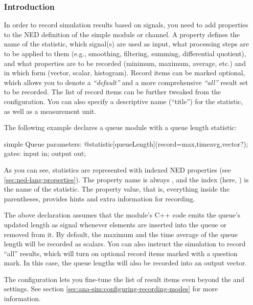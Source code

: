 \subsubsection{Introduction}
\label{sec:simple-modules:declared-statistics:introduction}

In order to record simulation results based on signals, you need to add
 properties to the NED definition of the simple module
or channel. A  property defines the name of the
statistic, which signal(s) are used as input, what processing steps are to
be applied to them (e.g., smoothing, filtering, summing, differential
quotient), and what properties are to be recorded (minimum, maximum,
average, etc.) and in which form (vector, scalar, histogram). Record items
can be marked optional, which allows you to denote a \textit{``default''}
and a more comprehensive \textit{``all''} result set to be recorded.
The list of record items can be further tweaked from the configuration.
You can also specify a descriptive name (``title'') for the statistic, as
well as a measurement unit.

The following example declares a queue module with a queue length statistic:

\begin{ned}
simple Queue
{
    parameters:
        @statistic[queueLength](record=max,timeavg,vector?);
    gates:
        input in;
        output out;
}
\end{ned}

As you can see, statistics are represented with indexed NED properties (see
\ref{sec:ned-lang:properties}). The property name is always ,
and the index (here, ) is the name of the statistic. The
property value, that is, everything inside the parentheses, provides hints
and extra information for recording.

The above  declaration assumes that the module's C++ code
emits the queue's updated length as signal  whenever
elements are inserted into the queue or removed from it.
By default, the maximum and the time average of the queue length will
be recorded as scalars. You can also instruct the simulation to record
``all'' results, which will turn on optional record items marked
with a question mark. In this case, the queue lengths will also be
recorded into an output vector.

\begin{note}
The configuration lets you fine-tune the list of result items even
beyond the  and  settings. See section
\ref{sec:ana-sim:configuring-recording-modes} for more information.
\end{note}

